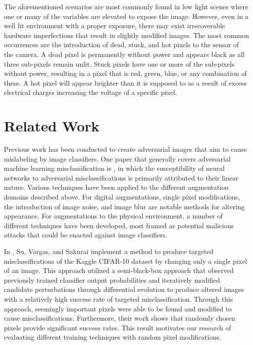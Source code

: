\documentclass[conference]{IEEEtran}
\begin{document}
The aforementioned scenarios are most commonly found in low light scenes where one or many of the variables are elevated to expose the image. However, even in a well lit environment with a proper exposure, there may exist irrecoverable hardware imperfections that result in slightly modified images. The most common occurrences are the introduction of dead, stuck, and hot pixels to the sensor of the camera. A dead pixel is permanently without power and appears black as all three sub-pixels remain unlit. Stuck pixels have one or more of the sub-pixels without power, resulting in a pixel that is red, green, blue, or any combination of these. A hot pixel will appear brighter than it is supposed to as a result of excess electrical charges increasing the voltage of a specific pixel.

\section{Related Work}

Previous work has been conducted to create adversarial images that aim to cause mislabeling by image classifiers. One paper that generally covers adversarial machine learning misclassification is \cite{goodfellowadversarial}, in which the susceptibility of neural networks to adversarial misclassifications is primarily attributed to their linear nature. Various techniques have been applied to the different augmentation domains described above. For digital augmentations, single pixel modifications, the introduction of image noise, and image blur are notable methods for altering appearance. For augmentations to the physical environment, a number of different techniques have been developed, most framed as potential malicious attacks that could be enacted against image classifiers.

In \cite{onepixelfoolingdnn}, Su, Vargas, and Sakurai implement a method to produce targeted misclassifications of the Kaggle CIFAR-10 dataset by changing only a single pixel of an image. This approach utilized a semi-black-box approach that observed previously trained classifier output probabilities and iteratively modified candidate perturbations through differential evolution to produce altered images with a relatively high success rate of targeted misclassification. Through this approach, seemingly important pixels were able to be found and modified to cause misclassifications. Furthermore, their work shows that randomly chosen pixels provide significant success rates. This result motivates our research of evaluating different training techniques with random pixel modifications.
\end{document}
